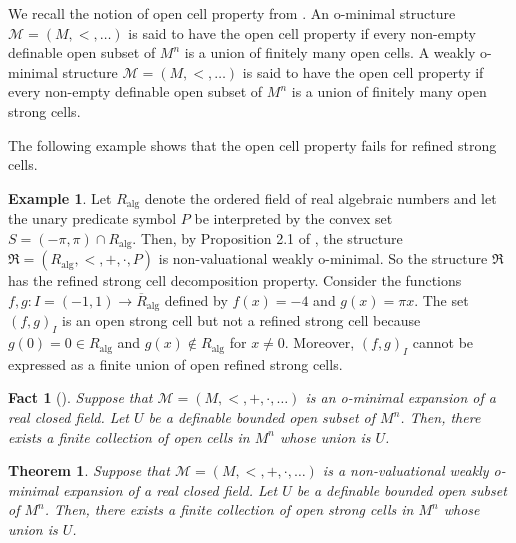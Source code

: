 \documentclass{amsart}
\theoremstyle{definition}
\newtheorem{example}[definition]{Example}
\theoremstyle{plain}
\newtheorem{theorem}[definition]{Theorem}
\newtheorem{fact}[definition]{Fact}
\newcommand{\cM}{\mathcal M}
\newcommand{\ov}[1]{\overline{#1}}
\begin{document}
We recall the notion of open cell property from \cite{A}.
An o-minimal structure $\mathcal M = (M, <, \dots)$ is said to have the open cell property
if every non-empty definable open subset of $M^n$ is a union of finitely many open cells.
A weakly o-minimal structure $\mathcal M = (M, <, \dots)$ is said to have the open cell property
if every non-empty definable open subset of $M^n$ is a union of finitely many open strong cells.

The following example shows that the open cell property fails for refined strong cells.

\begin{example}
Let $R_{\mathrm{alg}}$ denote the ordered field of real algebraic numbers 
and let the unary predicate symbol $P$ be interpreted by the convex set $S = (-\pi, \pi) \cap R_{\mathrm{alg}}$.
Then, by Proposition 2.1 of \cite{MMS},
the structure $\mathfrak R = (R_{\mathrm{alg}}, <, +, \cdot, P)$ is non-valuational weakly o-minimal.
So the structure $\mathfrak R$ has the refined strong cell decomposition property.
Consider the functions $f, g : I=(-1, 1) \to \ov{R}_{\mathrm{alg}}$ defined by $f(x) = -4$ and $g(x) = \pi x$.
The set $(f, g)_I$ is an open strong cell but not a refined strong cell
because $g(0) = 0 \in R_{\mathrm{alg}}$ and $g(x) \notin R_{\mathrm{alg}}$
for $x \neq 0$.
Moreover, $(f, g)_I$ cannot be expressed as a finite union of open refined strong cells.
\end{example}







\begin{fact}[{\cite[Theorem~1.3]{Wi}}] \label{Wi}
Suppose that  $\cM = (M, <, +, \cdot, \ldots)$ is an o-minimal expansion of a real closed field.
Let $U$ be a definable bounded open subset of $M^n$.
Then, there exists a finite collection of open  cells in $M^n$ whose union is $U$.
\end{fact}

\begin{theorem}
Suppose that  $\cM = (M, <, +, \cdot, \ldots)$ is a non-valuational weakly o-minimal expansion of a real closed field.
Let $U$ be a definable bounded open subset of $M^n$.
Then, there exists a finite collection of open strong cells in $M^n$ whose union is $U$.
\end{theorem}
\end{document}
